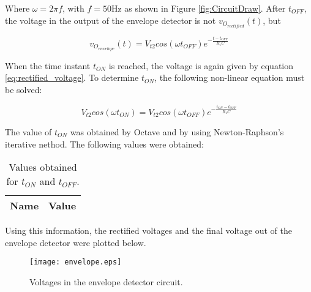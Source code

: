 Where $\omega=2\pi f$, with $f=50$Hz as shown in Figure \ref{fig:CircuitDraw}. After $t_{OFF}$, the voltage in the output of the envelope detector is not $v_{O_{rectified}}(t)$, but

\begin{equation} \label{eq:exponential_voltage}
  v_{O_{envelope}}(t)=V_{t2}cos(\omega t_{OFF})e^{-\frac{t-t_{OFF}}{R_1C}}
\end{equation}

When the time instant $t_{ON}$ is reached, the voltage is again given by equation \ref{eq:rectified_voltage}. To determine $t_{ON}$, the following non-linear equation must be solved:

\begin{equation} \label{eq:non_linear_equation_tON}
  V_{t2}cos(\omega t_{ON})=V_{t2}cos(\omega t_{OFF})e^{-\frac{t_{ON}-t_{OFF}}{R_1 C}}
\end{equation}

The value of $t_{ON}$ was obtained by Octave and by using Newton-Raphson's iterative nethod. The following values were obtained:

\begin{table}[H]
  \centering
  \begin{tabular}{|c|c|}
    \hline    
    {\bf Name} & {\bf Value} \\ \hline
    
  \end{tabular}
  \caption{Values obtained for $t_{ON}$ and $t_{OFF}$.}
  \label{tab:tON_tOFF}
\end{table}

Using this information, the rectified voltages and the final voltage out of the envelope detector were plotted below.


\begin{figure}[H] \centering
  \texttt{[image: envelope.eps]}
  \caption{Voltages in the envelope detector circuit.}
  \label{fig:envelope_voltages}
\end{figure}
